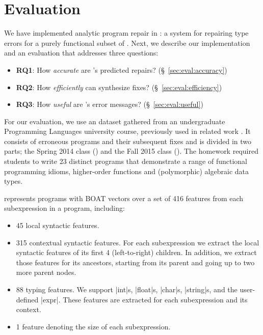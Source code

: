 \section{Evaluation}
\label{sec:eval}

\lstMakeShortInline[mathescape=true]{|}

We have implemented analytic program repair in \toolname: a system for
repairing type errors for a purely functional subset of \ocaml. Next,
we describe our implementation and an evaluation that addresses three
questions:

\begin{itemize}
    \item \textbf{RQ1}: How \emph{accurate} are \toolname's predicted repairs?
                        (\S~\ref{sec:eval:accuracy})
    \item \textbf{RQ2}: How \emph{efficiently} can \toolname synthesize fixes?
                        (\S~\ref{sec:eval:efficiency})
    \item \textbf{RQ3}: How \emph{useful} are \toolname's error messages?
                        (\S~\ref{sec:eval:useful})
\end{itemize}


%
For our evaluation, we use an \ocaml dataset gathered from an undergraduate
Programming Languages university course, previously used in related work
\citep{yunounderstand,Seidel:2017}. It consists of erroneous programs and their
subsequent fixes and is divided in two parts; the Spring 2014 class (\SPRING)
and the Fall 2015 class (\FALL). The homework required students to write 23
distinct programs that demonstrate a range of functional programming idioms, \eg
higher-order functions and (polymorphic) algebraic data types.

%
\toolname represents programs with BOAT vectors over
a set of 416 features from each subexpression in a
program, including:
%
\begin{itemize}
\item 45 local syntactic features.
%
\item 315 contextual syntactic features. For each subexpression we
extract the local syntactic features of its first 4
(left-to-right) children. In addition, we extract those features for its
ancestors, starting from its parent and going up to two more parent nodes.
\item 88 typing features. We support |int|s, |float|s, |char|s, |string|s, and
    the user-defined |expr|. These features are extracted for each
    subexpression and its context.
%
\item 1 feature denoting the size of each subexpression.
\end{itemize}

